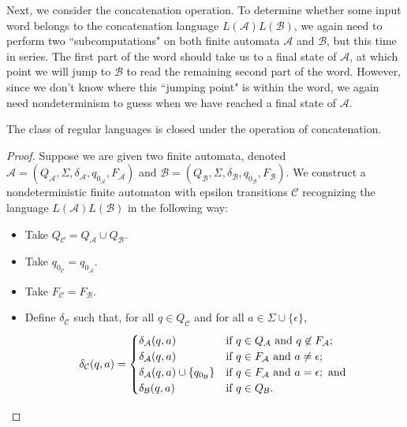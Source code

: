 Next, we consider the concatenation operation. To determine whether some input word belongs to the concatenation language $L(\mathcal{A})L(\mathcal{B})$, we again need to perform two ``subcomputations" on both finite automata $\mathcal{A}$ and $\mathcal{B}$, but this time in series. The first part of the word should take us to a final state of $\mathcal{A}$, at which point we will jump to $\mathcal{B}$ to read the remaining second part of the word. However, since we don't know where this ``jumping point" is within the word, we again need nondeterminism to guess when we have reached a final state of $\mathcal{A}$.

\begin{theorem}\label{thm:FAclosureconcatenation}
The class of regular languages is closed under the operation of concatenation.

\begin{proof}
Suppose we are given two finite automata, denoted $\mathcal{A} = (Q_{\mathcal{A}}, \Sigma, \allowbreak \delta_{\mathcal{A}}, q_{0_{\mathcal{A}}}, F_{\mathcal{A}})$ and $\mathcal{B} = (Q_{\mathcal{B}}, \Sigma, \delta_{\mathcal{B}}, q_{0_{\mathcal{B}}}, F_{\mathcal{B}})$. We construct a nondeterministic finite automaton with epsilon transitions $\mathcal{C}$ recognizing the language $L(\mathcal{A})L(\mathcal{B})$ in the following way:
\begin{itemize}
\item Take $Q_{\mathcal{C}} = Q_{\mathcal{A}} \cup Q_{\mathcal{B}}$.
\item Take $q_{0_{\mathcal{C}}} = q_{0_{\mathcal{A}}}$.
\item Take $F_{\mathcal{C}} = F_{\mathcal{B}}$.
\item Define $\delta_{\mathcal{C}}$ such that, for all $q \in Q_{\mathcal{C}}$ and for all $a \in \Sigma \cup \{\epsilon\}$,
\begin{equation*}
\delta_{\mathcal{C}}(q, a) = 
\begin{cases}
\delta_{\mathcal{A}}(q, a)							& \text{if } q \in Q_{\mathcal{A}} \text{ and } q \not\in F_{\mathcal{A}}; \\
\delta_{\mathcal{A}}(q, a)							& \text{if } q \in F_{\mathcal{A}} \text{ and } a \neq \epsilon; \\
\delta_{\mathcal{A}}(q, a) \cup \{q_{0_{\mathcal{B}}}\}	& \text{if } q \in F_{\mathcal{A}} \text{ and } a = \epsilon; \text{ and} \\
\delta_{\mathcal{B}}(q, a)							& \text{if } q \in Q_{\mathcal{B}}. \\
\end{cases}
\qedhere
\end{equation*}
\end{itemize}
\end{proof}
\end{theorem}


